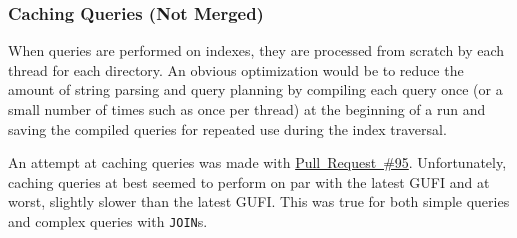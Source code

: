 \subsubsection{Caching Queries (Not Merged)}
When queries are performed on indexes, they are processed from scratch
by each thread for each directory. An obvious optimization would be to
reduce the amount of string parsing and query planning by compiling
each query once (or a small number of times such as once per thread)
at the beginning of a run and saving the compiled queries for repeated
use during the index traversal.

An attempt at caching queries was made with
\href{https://github.com/mar-file-system/GUFI/pull/95}{Pull~Request~\#95}.
Unfortunately, caching queries at best seemed to perform on par with
the latest GUFI and at worst, slightly slower than the latest
GUFI. This was true for both simple queries and complex queries with
\texttt{JOIN}s.
